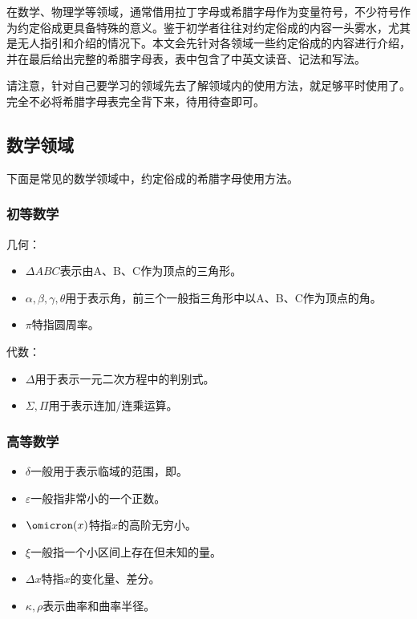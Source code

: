 \begin{issues}
\issueDraft
\end{issues}

在数学、物理学等领域，通常借用拉丁字母或希腊字母作为变量符号，不少符号作为约定俗成更具备特殊的意义。鉴于初学者往往对约定俗成的内容一头雾水，尤其是无人指引和介绍的情况下。本文会先针对各领域一些约定俗成的内容进行介绍，并在最后给出完整的希腊字母表，表中包含了中英文读音、记法和写法。

请注意，针对自己要学习的领域先去了解领域内的使用方法，就足够平时使用了。完全不必将希腊字母表完全背下来，待用待查即可。

\subsection{数学领域}

下面是常见的数学领域中，约定俗成的希腊字母使用方法。

\subsubsection{初等数学}

几何：

\begin{itemize}
\item $\Delta ABC$表示由A、B、C作为顶点的三角形。
\item $\alpha,\beta,\gamma,\theta$用于表示角，前三个一般指三角形中以A、B、C作为顶点的角。
\item $\pi$特指圆周率。
\end{itemize}

代数：

\begin{itemize}
\item $\Delta$用于表示一元二次方程中的判别式。
\item $\Sigma,\Pi$用于表示连加/连乘运算。
\end{itemize}

\subsubsection{高等数学}

\begin{itemize}
\item $\delta$一般用于表示临域的范围，即。
\item $\varepsilon$一般指非常小的一个正数。
\item $\omicron (x)$特指$x$的高阶无穷小。
\item $\xi$一般指一个小区间上存在但未知的量。
\item $\Delta x$特指$x$的变化量、差分。
\item $\kappa,\rho$表示曲率和曲率半径。
\end{itemize}

